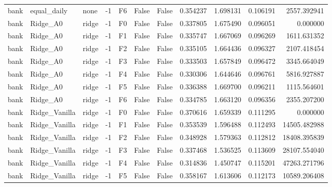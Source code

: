 \begin{tabular}{lllrlllrrrr}
      bank &    equal\_daily &      none &    -1 &  F6 &           False &            False &  0.354237 &  1.698131 & 0.106191 &      2557.392941 \\
      bank &       Ridge\_A0 &     ridge &    -1 &  F0 &           False &            False &  0.337805 &  1.675490 & 0.096051 &         0.000000 \\
      bank &       Ridge\_A0 &     ridge &    -1 &  F1 &           False &            False &  0.335747 &  1.667069 & 0.096269 &      1611.631352 \\
      bank &       Ridge\_A0 &     ridge &    -1 &  F2 &           False &            False &  0.335105 &  1.664436 & 0.096327 &      2107.418454 \\
      bank &       Ridge\_A0 &     ridge &    -1 &  F3 &           False &            False &  0.333503 &  1.657849 & 0.096472 &      3345.664049 \\
      bank &       Ridge\_A0 &     ridge &    -1 &  F4 &           False &            False &  0.330306 &  1.644646 & 0.096761 &      5816.927887 \\
      bank &       Ridge\_A0 &     ridge &    -1 &  F5 &           False &            False &  0.336388 &  1.669700 & 0.096211 &      1115.564601 \\
      bank &       Ridge\_A0 &     ridge &    -1 &  F6 &           False &            False &  0.334785 &  1.663120 & 0.096356 &      2355.207200 \\
      bank &  Ridge\_Vanilla &     ridge &    -1 &  F0 &           False &            False &  0.370616 &  1.659339 & 0.111295 &         0.000000 \\
      bank &  Ridge\_Vanilla &     ridge &    -1 &  F1 &           False &            False &  0.353539 &  1.596488 & 0.112493 &     14505.482988 \\
      bank &  Ridge\_Vanilla &     ridge &    -1 &  F2 &           False &            False &  0.348928 &  1.579363 & 0.112812 &     18408.395839 \\
      bank &  Ridge\_Vanilla &     ridge &    -1 &  F3 &           False &            False &  0.337468 &  1.536525 & 0.113609 &     28107.554040 \\
      bank &  Ridge\_Vanilla &     ridge &    -1 &  F4 &           False &            False &  0.314836 &  1.450747 & 0.115201 &     47263.271796 \\
      bank &  Ridge\_Vanilla &     ridge &    -1 &  F5 &           False &            False &  0.358167 &  1.613606 & 0.112173 &     10589.206408 \\

\end{tabular}
